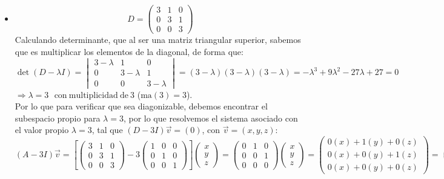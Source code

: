 \begin{itemize}
    \item 
    $$D=\begin{pmatrix}3&1&0\\ 0&3&1\\ 0&0&3\end{pmatrix}$$
    Calculando determinante, que al ser una matriz triangular superior, sabemos que es multiplicar los elementos de la diagonal, de forma que:
    $$\det(D-\lambda I)= \begin{vmatrix}3-\lambda &1&0\\ 0&3-\lambda &1\\ 0&0&3-\lambda \end{vmatrix}=(3-\lambda)(3-\lambda)(3-\lambda)=-\lambda ^3+9\lambda ^2-27\lambda +27=0$$
    $\Longrightarrow \lambda=3~~\mathrm{\:con\:multiplicidad\:de\:}3$ ($\text{ma}(3)=3$).\\
    Por lo que para verificar que sea diagonizable, debemos encontrar el subespacio propio para $\lambda=3$, por lo que resolvemos el sistema asociado con el valor propio $\lambda=3$, tal que $(D-3I)\vec{v}=(0)$, con $\vec{v}=(x,y,z)$:
    $$\left(A-3I\right)\vec{v}=\left[\begin{pmatrix}3&1&0\\ 0&3&1\\ 0&0&3\end{pmatrix}-3\begin{pmatrix}1&0&0\\ 0&1&0\\ 0&0&1\end{pmatrix}\right]\begin{pmatrix}x\\ y\\ z\end{pmatrix}=\begin{pmatrix}0&1&0\\ 0&0&1\\ 0&0&0\end{pmatrix}\begin{pmatrix}x\\ y\\ z\end{pmatrix}=\begin{pmatrix}0(x)+1(y)+0(z)\\ 0(x)+0(y)+1(z)\\0(x)+0(y)+0(z)\end{pmatrix}=\begin{pmatrix}y\\ z\\ 0\end{pmatrix}=\begin{pmatrix}0\\ 0\\ 0\end{pmatrix}$$

\end{itemize}

